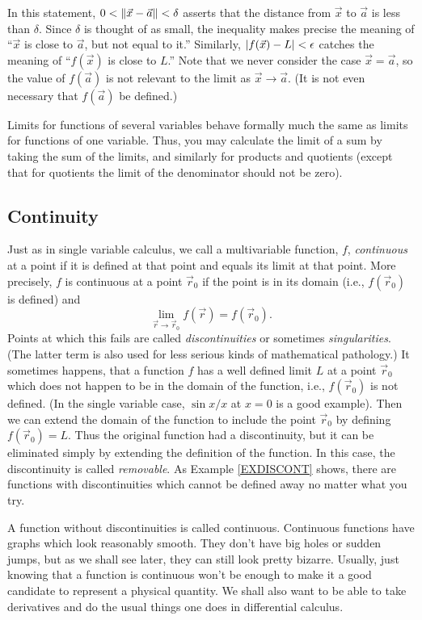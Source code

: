 \DefLimit

In this statement, $0<\lVert\vec x - \vec a\rVert < \delta$ asserts that the distance
from $\vec x$ to $\vec a$ is less than $\delta$.  Since $\delta$ is
thought of as small, the inequality  makes precise the meaning of
``$\vec x$ is close to $\vec a$, but not equal to it.''   Similarly, $\lvert f(\vec x) - L\rvert < 
\epsilon$ catches the meaning of ``$f(\vec x)$ is close to 
$L$.''  Note that we never consider the case $\vec x = \vec a$,
so the value of $f(\vec a)$
 is not relevant to the limit as $\vec x \to \vec a$.
(It is not even necessary that $f(\vec a)$  be defined.)

Limits for functions of several variables behave formally much
the same as limits for functions of one variable.  Thus, you
may calculate the limit of a sum by taking the sum of the
limits, and similarly for products and quotients (except that
for quotients the limit of the denominator should not be zero).

\subsection{Continuity}
Just as in single variable calculus, we call a multivariable function, $f$,
\emph{continuous}
at a point
if it is defined at that point and equals its limit at that point.
More precisely, 
$f$ is continuous at a point $\vec r_0$ if the point is in its domain (i.e.,
$f(\vec r_0)$ is defined) and
\[
  \lim_{\vec r \to \vec r_0} f(\vec r) = f(\vec r_0).
\]
Points at which this fails  are called \emph{discontinuities}
or sometimes \emph{singularities}.   (The latter term is also 
used for less serious kinds of mathematical pathology.)  It
sometimes happens, that a function $f$ has a well defined limit $L$ at
a point $\vec r_0$ which does not happen to be in the domain of the function,
i.e., $f(\vec r_0)$ is not defined.  (In the single variable case,
$\sin x/ x$ at $x = 0$ is a good example).  Then we can extend the
domain of the function to include the point $\vec r_0$ by defining
$f(\vec r_0) = L$.   Thus the original function had a discontinuity,
but it can be eliminated simply by extending the definition of the
function.  In this case, the discontinuity is called
\emph{removable}.   As Example \ref{EXDISCONT} shows, there are functions
with  discontinuities
which cannot be defined away no matter what you try.  
 
  A function without discontinuities is called continuous.
Continuous functions have graphs which look reasonably 
smooth.  They don't have big holes or sudden jumps,
 but as we shall see later, they can still look pretty
bizarre.   Usually, just knowing that a function is continuous
won't be enough to make it a good candidate to represent a
physical quantity.  We shall also want to be able to take
derivatives and do the usual things one does in differential
calculus.


